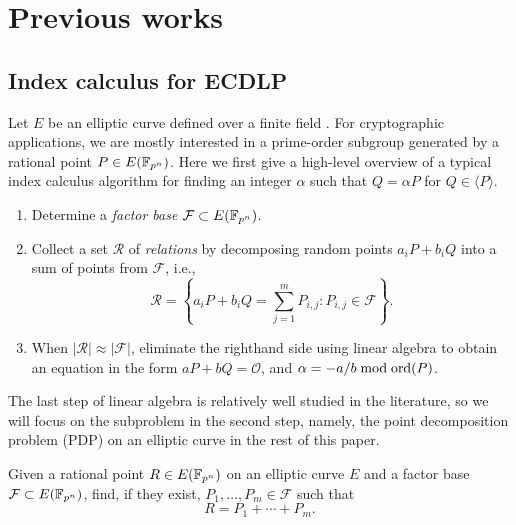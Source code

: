 %
%

\section{Previous works}
\label{sec:previous-work}

\subsection{Index calculus for ECDLP}
%
\label{sec:index-calculus-ecdlp}
%
Let $E$ be an elliptic curve defined over a finite field .
%
For cryptographic applications, we are mostly interested in a
prime-order subgroup generated by a rational point $P\in E(\mathbb F_{p^n})$.
%
Here we first give a high-level overview of a typical index calculus
algorithm for finding an integer $\alpha$ such that $Q=\alpha P$ for
$Q\in\langle P\rangle$.
%
\begin{enumerate}
%
\item Determine a \emph{factor base} $\mathcal F\subset E(\mathbb F_{p^n})$.
%
\item Collect a set $\mathcal R$ of \emph{relations} by decomposing
  random points $a_iP+b_iQ$ into a sum of points from $\mathcal F$,
  i.e.,
  \[ \mathcal
    R=\left\{a_iP+b_iQ=\sum_{j=1}^mP_{i,j}:P_{i,j}\in\mathcal
      F\right\}. \]
%
\item When $|\mathcal R|\approx|\mathcal F|$, eliminate the righthand
  side using linear algebra to obtain an equation in the form
  $aP+bQ=\mathcal O$, and $\alpha=-a/b\bmod\operatorname{ord}(P)$.
%
\end{enumerate}
%
The last step of linear algebra is relatively well studied in the
literature, so we will focus on the subproblem in the second step,
namely, the point decomposition problem (PDP) on an elliptic curve in
the rest of this paper.
%
\begin{definition}
\label{def:pdp}
% 
Given a rational point $R\in E(\mathbb F_{p^n})$ on an elliptic curve $E$ and
a factor base $\mathcal F\subset E(\mathbb F_{p^n})$, find, if they exist,
$P_1,\dots,P_m\in\mathcal F$ such that \[ R=P_1 + \cdots + P_m. \]
%
\end{definition}

